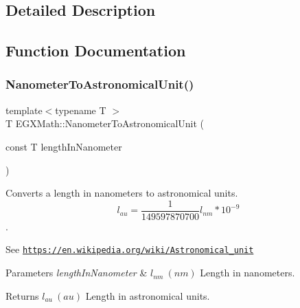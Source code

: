 \subsection{Detailed Description}


\subsection{Function Documentation}
\mbox{\label{group___e_g_x_math-_conversions-_length_conversions-_s_i-_nanometer-_astronomical_gab45f259430dc605beef983b095325ce1}} 
\subsubsection{\texorpdfstring{Nanometer\+To\+Astronomical\+Unit()}{NanometerToAstronomicalUnit()}}
{\footnotesize\ttfamily template$<$typename T $>$ \\
T E\+G\+X\+Math\+::\+Nanometer\+To\+Astronomical\+Unit (\begin{DoxyParamCaption}\item[{const T}]{length\+In\+Nanometer }\end{DoxyParamCaption})}



Converts a length in nanometers to astronomical units. \[ l_{au}= \frac{1}{149597870700} l_{nm} * 10^{-9} \]. 

See \href{https://en.wikipedia.org/wiki/Astronomical_unit}{\tt https\+://en.\+wikipedia.\+org/wiki/\+Astronomical\+\_\+unit} 
\begin{DoxyParams}{Parameters}
{\em length\+In\+Nanometer} & $ l_{nm}\ (nm)$ Length in nanometers. \\
\hline
\end{DoxyParams}
\begin{DoxyReturn}{Returns}
$ l_{au}\ (au)$ Length in astronomical units. 
\end{DoxyReturn}
\mbox{\label{group___e_g_x_math-_conversions-_length_conversions-_s_i-_nanometer-_astronomical_ga9ef3d82e1ccb8e07dfb52500ff447b17}} 
